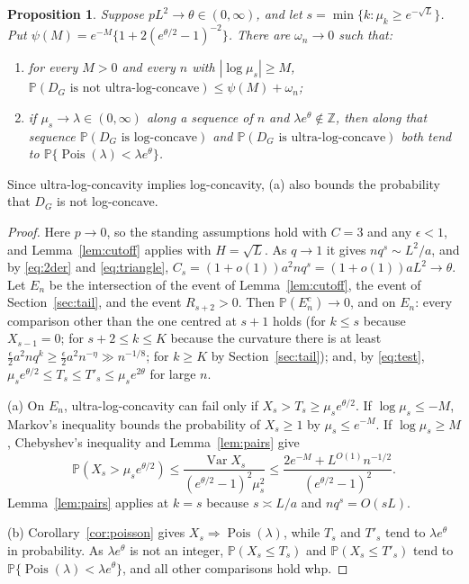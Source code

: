 \documentclass[11pt]{article}
\newtheorem{proposition}[theorem]{Proposition}
\theoremstyle{remark}
\newcommand{\PP}{\mathbb P}
\newcommand{\Var}{\operatorname{Var}}
\newcommand{\Pois}{\operatorname{Pois}}
\begin{document}
\begin{proposition}\label{prop:general}
Suppose $pL^2\to\theta\in(0,\infty)$, and let $s=\min\{k:\mu_k\ge e^{-\sqrt L}\}$. Put $\psi(M)=e^{-M}\{1+2(e^{\theta/2}-1)^{-2}\}$. There are $\omega_n\to0$ such that:
\begin{enumerate}[label=(\alph*)]
\item for every $M>0$ and every $n$ with $|\log\mu_s|\ge M$,
 $\PP(D_G\text{ is not ultra-log-concave})\le\psi(M)+\omega_n$;
\item if $\mu_s\to\lambda\in(0,\infty)$ along a sequence of $n$ and $\lambda e^\theta\notin\mathbb Z$, then along that sequence $\PP(D_G\text{ is log-concave})$ and $\PP(D_G\text{ is ultra-log-concave})$ both tend to $\PP\{\Pois(\lambda)<\lambda e^\theta\}$.
\end{enumerate}
\end{proposition}
Since ultra-log-concavity implies log-concavity, (a) also bounds the probability that $D_G$ is not log-concave.
\begin{proof}
Here $p\to0$, so the standing assumptions hold with $C=3$ and any $\epsilon<1$, and Lemma~\ref{lem:cutoff} applies with $H=\sqrt L$. As $q\to1$ it gives $nq^s\sim L^2/a$, and by \eqref{eq:2der} and \eqref{eq:triangle}, $C_s=(1+o(1))a^2nq^s=(1+o(1))aL^2\to\theta$. Let $E_n$ be the intersection of the event of Lemma~\ref{lem:cutoff}, the event of Section~\ref{sec:tail}, and the event $R_{s+2}>0$. Then $\PP(E_n^c)\to0$, and on $E_n$: every comparison other than the one centred at $s+1$ holds (for $k\le s$ because $X_{s-1}=0$; for $s+2\le k\le K$ because the curvature there is at least $\frac\epsilon2a^2nq^{k}\ge\frac\epsilon2a^2n^{-\eta}\gg n^{-1/8}$; for $k\ge K$ by Section~\ref{sec:tail}); and, by \eqref{eq:test}, $\mu_se^{\theta/2}\le T_s\le T'_s\le\mu_se^{2\theta}$ for large $n$.

(a) On $E_n$, ultra-log-concavity can fail only if $X_s>T_s\ge\mu_se^{\theta/2}$. If $\log\mu_s\le-M$, Markov's inequality bounds the probability of $X_s\ge1$ by $\mu_s\le e^{-M}$. If $\log\mu_s\ge M$, Chebyshev's inequality and Lemma~\ref{lem:pairs} give
\[
 \PP(X_s>\mu_se^{\theta/2})\le\frac{\Var X_s}{(e^{\theta/2}-1)^2\mu_s^2}\le\frac{2e^{-M}+L^{O(1)}n^{-1/2}}{(e^{\theta/2}-1)^2}.
\]
Lemma~\ref{lem:pairs} applies at $k=s$ because $s\asymp L/a$ and $nq^s=O(sL)$.

(b) Corollary~\ref{cor:poisson} gives $X_s\Rightarrow\Pois(\lambda)$, while $T_s$ and $T'_s$ tend to $\lambda e^\theta$ in probability. As $\lambda e^\theta$ is not an integer, $\PP(X_s\le T_s)$ and $\PP(X_s\le T'_s)$ tend to $\PP\{\Pois(\lambda)<\lambda e^\theta\}$, and all other comparisons hold whp.
\end{proof}
\end{document}
